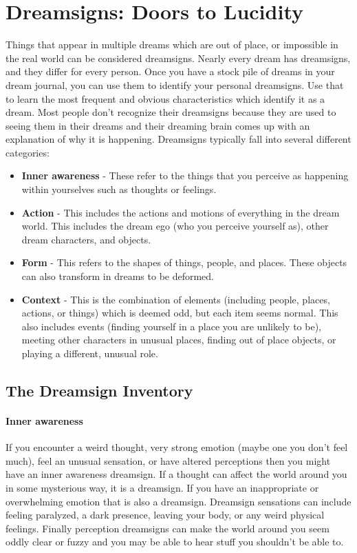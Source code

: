 \documentclass{report}
\begin{document}
\section{Dreamsigns: Doors to Lucidity}
Things that appear in multiple dreams which are out of place, or impossible in the real world can be considered dreamsigns. Nearly every dream has dreamsigns, and they differ for every person. Once you have a stock pile of dreams in your dream journal, you can use them to identify your personal dreamsigns. Use that to learn the most frequent and obvious characteristics which identify it as a dream. Most people don't recognize their dreamsigns because they are used to seeing them in their dreams and their dreaming brain comes up with an explanation of why it is happening. Dreamsigns typically fall into several different categories:
\begin{itemize}
  \item \textbf{Inner awareness} - These refer to the things that you perceive as happening within yourselves such as thoughts or feelings.
  \item \textbf{Action} - This includes the actions and motions of everything in the dream world. This includes the dream ego (who you perceive yourself as), other dream characters, and objects.
  \item \textbf{Form} - This refers to the shapes of things, people, and places. These objects can also transform in dreams to be deformed.
  \item \textbf{Context} - This is the combination of elements (including people, places, actions, or things) which is deemed odd, but each item seems normal. This also includes events (finding yourself in a place you are unlikely to be), meeting other characters in unusual places, finding out of place objects, or playing a different, unusual role.
\end{itemize}

\subsection{The Dreamsign Inventory \cite{leberge}}
\paragraph{Inner awareness} If you encounter a weird thought, very strong emotion (maybe one you don't feel much), feel an unusual sensation, or have altered perceptions then you might have an inner awareness dreamsign. If a thought can affect the world around you in some mysterious way, it is a dreamsign. If you have an inappropriate or overwhelming emotion that is also a dreamsign. Dreamsign sensations can include feeling paralyzed, a dark presence, leaving your body, or any weird physical feelings. Finally perception dreamsigns can make the world around you seem oddly clear or fuzzy and you may be able to hear stuff you shouldn't be able to.
\end{document}
